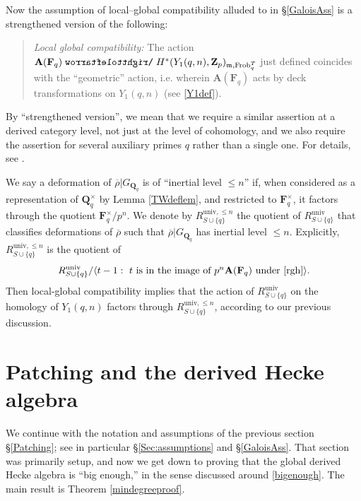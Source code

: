 \documentclass[10pt]{amsart}
\def\acts{\mathrel{\reflectbox{$\righttoleftarrow$}}}
\newcommand{\Z}{\mathbf{Z}}
\newcommand{\univ}{\mathrm{univ}}
\newcommand{\rhobar}{\overline{\rho}}
\newcommand{\Frob}{\mathrm{Frob}}
\newcommand{\Q}{\mathbf{Q}}
\newcommand{\ramprimes}{S}
\theoremstyle{remark}
\begin{document}
Now the assumption of local--global compatibility alluded to in \S \ref{GaloisAss}
is a strengthened version of the following:
\begin{quote}
{\em Local global compatibility: }
The action  $\mathbf{A}(\mathbf{F}_q) \acts H^*(Y_1(q,n), \Z_p)_{\mathfrak{m}, \Frob_q^T}$ 
just defined coincides with the ``geometric'' action, i.e.
wherein $\mathbf{A}(\mathbf{F}_q)$ acts by deck transformations   on $Y_1(q,n)$ (see \eqref{Y1def}).
\end{quote}
By ``strengthened version'', we mean that we require a similar assertion at a derived category level, not just at the level of cohomology,
and we also require the assertion for several auxiliary primes $q$ rather than a single one. 
For details, see \cite[\S 13.5]{GV}. 











  
 We say a deformation  of $\rhobar|G_{\Q_{q}}$ is of ``inertial level $\leq n$''   \label{inertial level}
 if,  when considered as a representation of $\Q_{q}^{\times}$ by  Lemma \ref{TWdeflem},  and restricted to $\mathbf{F}_{q}^{\times}$,  
 it factors through the quotient $\mathbf{F}_{q}^{\times}/p^n$. 
 We denote by $R^{\univ, \leq n}_{\ramprimes \cup \{q\}}$ the quotient of $R^{\univ}_{\ramprimes \cup \{q\}}$ that classifies deformations of $\rhobar$
 such that $\rhobar|G_{\Q_{q}}$ has inertial  level $\leq n$.  
 Explicitly, $R^{\univ,\leq n}_{\ramprimes \cup \{q\}}$ is the quotient of 
\begin{equation} \label{Rndef} R^{\univ}_{\ramprimes \cup \{q\}} / \langle t-1: \mbox{ $t$ is in the image of  $p^n \mathbf{A}(\mathbf{F}_{q})$ under \eqref{rgh}} \rangle.\end{equation}
  Then local-global compatibility implies that the action of $R^{\univ}_{\ramprimes \cup \{q\}}$ on the homology of $Y_1(q, n)$ factors through $R^{\univ, \leq n}_{\ramprimes \cup \{q\}}$, according to our previous discussion. 
  
   
 

\section{Patching and the derived Hecke algebra} \label{Patching2}


We continue with the notation  and assumptions of the previous section \S \ref{Patching}; see in particular
\S  \ref{Sec:assumptions} and \S \ref{GaloisAss}. 
That section was primarily setup, and now we get down to proving that the global derived Hecke algebra is ``big enough,''
in the sense discussed around 
\eqref{bigenough}. 
The main result is
Theorem \ref{mindegreeproof}. 
\end{document}
